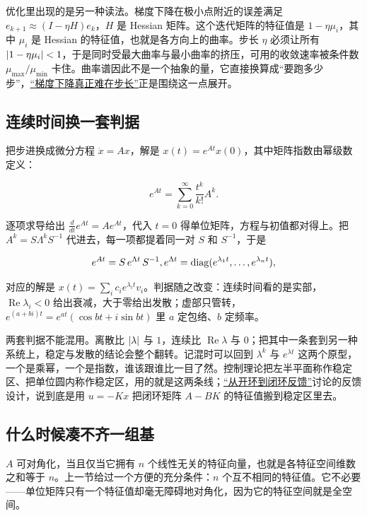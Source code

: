 优化里出现的是另一种读法。梯度下降在极小点附近的误差满足 \(e_{k+1}\approx(I-\eta H)e_k\)，\(H\) 是 Hessian 矩阵。这个迭代矩阵的特征值是 \(1-\eta\mu_i\)，其中 \(\mu_i\) 是 Hessian 的特征值，也就是各方向上的曲率。步长 \(\eta\) 必须让所有 \(\left|1-\eta\mu_i\right|<1\)，于是同时受最大曲率与最小曲率的挤压，可用的收敛速率被条件数 \(\mu_{\max}/\mu_{\min}\) 卡住。曲率谱因此不是一个抽象的量，它直接换算成``要跑多少步''，\hyperref[sec:09-Convex-Optimization/06-Optimization-Algorithms/01]{``梯度下降真正难在步长''}正是围绕这一点展开。

\subsection{连续时间换一套判据}

把步进换成微分方程 \(\dot x=Ax\)，解是 \(x(t)=e^{At}x(0)\)，其中矩阵指数由幂级数定义：

\[
e^{At}=\sum_{k=0}^{\infty}\frac{t^k}{k!}A^k .
\]

逐项求导给出 \(\tfrac{d}{dt}e^{At}=Ae^{At}\)，代入 \(t=0\) 得单位矩阵，方程与初值都对得上。把 \(A^k=S\Lambda^kS^{-1}\) 代进去，每一项都提着同一对 \(S\) 和 \(S^{-1}\)，于是

\[
e^{At}=S\,e^{\Lambda t}\,S^{-1},
\space
e^{\Lambda t}=\operatorname{diag}(e^{\lambda_1t},\dots,e^{\lambda_nt}),
\]

对应的解是 \(x(t)=\sum_i c_ie^{\lambda_it}v_i\)。判据随之改变：连续时间看的是实部，\(\operatorname{Re}\lambda_i<0\) 给出衰减，大于零给出发散；虚部只管转，\(e^{(a+bi)t}=e^{at}(\cos bt+i\sin bt)\) 里 \(a\) 定包络、\(b\) 定频率。

两套判据不能混用。离散比 \(\left|\lambda\right|\) 与 \(1\)，连续比 \(\operatorname{Re}\lambda\) 与 \(0\)；把其中一条套到另一种系统上，稳定与发散的结论会整个翻转。记混时可以回到 \(\lambda^k\) 与 \(e^{\lambda t}\) 这两个原型，一个是乘幂，一个是指数，谁该跟谁比一目了然。控制理论把左半平面称作稳定区、把单位圆内称作稳定区，用的就是这两条线；\hyperref[sec:16-Control-and-Reinforcement-Learning/01-Optimal-Control/01]{``从开环到闭环反馈''}讨论的反馈设计，说到底是用 \(u=-Kx\) 把闭环矩阵 \(A-BK\) 的特征值搬到稳定区里去。

\subsection{什么时候凑不齐一组基}

\(A\) 可对角化，当且仅当它拥有 \(n\) 个线性无关的特征向量，也就是各特征空间维数之和等于 \(n\)。上一节给过一个方便的充分条件：\(n\) 个互不相同的特征值。它不必要——单位矩阵只有一个特征值却毫无障碍地对角化，因为它的特征空间就是全空间。

